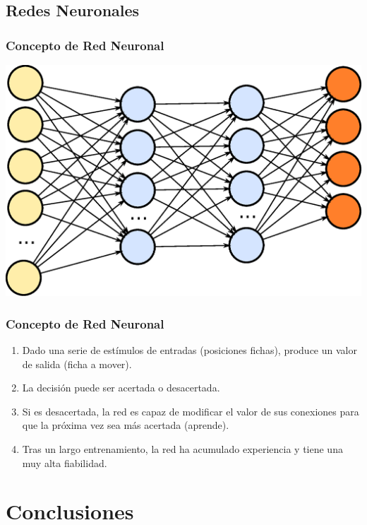 \documentclass[a4paper,t,xcolor=pst,dvips,colortheme]{beamer}
\begin{document}
\begin{frame}[t]
{{        }
    }
\end{frame}

\subsection{Redes Neuronales}

\begin{frame}[c]
    \frametitle{Concepto de Red Neuronal}
    \begin{center}
        \includegraphics[width=0.85\linewidth]{images/neural/neuralNetwork.eps}
    \end{center}
\end{frame}

\begin{frame}[c]
    \frametitle{Concepto de Red Neuronal}
    \begin{enumerate}[<+->]
        \item Dado una serie de estímulos de entradas (posiciones fichas), produce un valor de salida (ficha a mover).
        \item La decisión puede ser acertada o desacertada.
        \item Si es desacertada, la red es capaz de modificar el valor de sus conexiones para que la próxima vez sea más acertada (aprende).
        \item Tras un largo entrenamiento, la red ha acumulado experiencia y tiene una muy alta fiabilidad.
    \end{enumerate}
\end{frame}

\section{Conclusiones}
\end{document}
